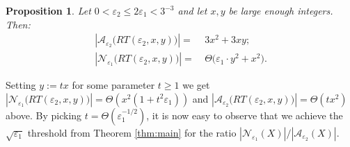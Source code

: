 \documentclass[12pt]{article}
\newtheorem{prop}[thm]{Proposition}
\newcommand{\eps}{\varepsilon}
\begin{document}
\begin{prop}\label{2nd-example}
    Let $0<\eps_2\leq2\eps_1<3^{-3}$ and let $x,y$ be large enough integers. Then:
    \begin{align*}
     \left|\mathcal{A}_{\eps_2}\big(RT(\eps_2,x,y)\big)\right|=&\ 3x^2+3xy; \\
     \left|\mathcal{N}_{\eps_1}\big(RT(\eps_2,x,y)\big)\right|=&\ \Theta\big(\eps_1\cdot y^2+ x^2\big).
\end{align*}
\end{prop}

Setting $y:=tx$ for some parameter $t\geq 1$ we get $\left|\mathcal{N}_{\eps_1}\big(RT(\eps_2,x,y)\big)\right|=\Theta\left(x^2(1+t^2\eps_1)\right)$ and $\left|\mathcal{A}_{\eps_2}\big(RT(\eps_2,x,y)\big)\right|=\Theta (tx^2)$ above. By picking $t=\Theta\left(\eps_1^{-1/2}\right)$, it is now easy to observe that we achieve the $\sqrt{\eps_1}$ threshold from Theorem \ref{thm:main} for the ratio $|\mathcal{N}_{\eps_1}(X)|/|\mathcal{A}_{\eps_2}(X)|$.
\end{document}
